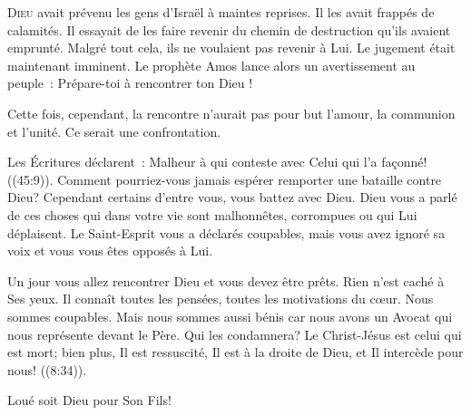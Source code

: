 
\lettrine{D}{ieu} avait prévenu les gens d'Israël à maintes reprises.
 Il les avait frappés de calamités. Il essayait de les faire revenir
 du chemin de destruction qu'ils avaient emprunté.
 Malgré tout cela, ils ne voulaient pas revenir à Lui.
 Le jugement était maintenant imminent.
 Le prophète Amos lance alors un avertissement au peuple~:
 \Og Prépare-toi à rencontrer ton Dieu ! \Fg{}

Cette fois, cependant, la rencontre n'aurait pas pour but l'amour,
 la communion et l'unité. Ce serait une confrontation. 


Les Écritures déclarent~: 
 \Og Malheur à qui conteste avec Celui qui l'a fa\c{c}onné! \Fg{}
 ((45:9)).
 Comment pourriez-vous jamais espérer remporter une bataille contre Dieu?
 Cependant certains d'entre vous, vous battez avec Dieu.
 Dieu vous a parlé de ces choses qui dans votre vie sont malhonnêtes,
 corrompues ou qui Lui déplaisent. Le Saint-Esprit vous a déclarés coupables,
 mais vous avez ignoré sa voix et vous vous êtes opposés à Lui. 

Un jour vous allez rencontrer Dieu et vous devez être prêts.
 Rien n'est caché à Ses yeux. Il connaît toutes les pensées,
 toutes les motivations du c\oe{}ur. Nous sommes coupables.
 Mais nous sommes aussi bénis \ocadr car nous avons un Avocat qui nous
 représente devant le Père.
 \Og Qui les condamnera? Le Christ-Jésus est celui qui est mort;
 bien plus, Il est ressuscité, Il est à la droite de Dieu,
 et Il intercède pour nous! \Fg{} ((8:34)). 

Loué soit Dieu pour Son Fils! 

\dvrule







